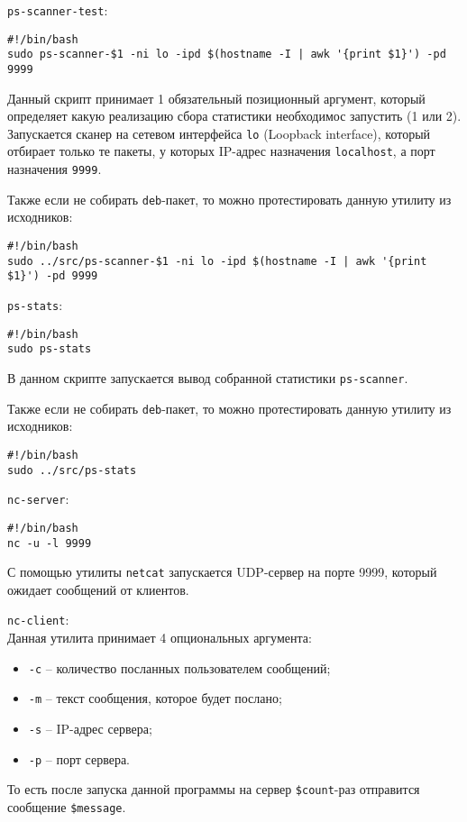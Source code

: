 \linespace

\verb|ps-scanner-test|:
\begin{lstlisting}
#!/bin/bash
sudo ps-scanner-$1 -ni lo -ipd $(hostname -I | awk '{print $1}') -pd 9999
\end{lstlisting}
Данный скрипт принимает 1 обязательный позиционный аргумент, который определяет какую реализацию сбора статистики необходимос запустить (1 или 2). Запускается сканер на сетевом интерфейса \verb|lo| (Loopback interface), который отбирает только те пакеты, у которых IP-адрес назначения \verb|localhost|, а порт назначения \verb|9999|.

\linespace

Также если не собирать \verb|deb|-пакет, то можно протестировать данную утилиту из исходников:
\begin{lstlisting}
#!/bin/bash
sudo ../src/ps-scanner-$1 -ni lo -ipd $(hostname -I | awk '{print $1}') -pd 9999
\end{lstlisting}

\newpage

\verb|ps-stats|:
\begin{lstlisting}
#!/bin/bash
sudo ps-stats
\end{lstlisting}
В данном скрипте запускается вывод собранной статистики \verb|ps-scanner|.

\linespace

Также если не собирать \verb|deb|-пакет, то можно протестировать данную утилиту из исходников:
\begin{lstlisting}
#!/bin/bash
sudo ../src/ps-stats
\end{lstlisting}

\linespace

\verb|nc-server|:
\begin{lstlisting}
#!/bin/bash
nc -u -l 9999
\end{lstlisting}
С помощью утилиты \verb|netcat| запускается UDP-сервер на порте 9999, который ожидает сообщений от клиентов.

\linespace

\verb|nc-client|:\\
Данная утилита принимает 4 опциональных аргумента:
\begin{itemize}
    \item \verb|-c| -- количество посланных пользователем сообщений;
    \item \verb|-m| -- текст сообщения, которое будет послано;
    \item \verb|-s| -- IP-адрес сервера;
    \item \verb|-p| -- порт сервера.
\end{itemize}
То есть после запуска данной программы на сервер \verb|$count|-раз отправится сообщение \verb|$message|.

